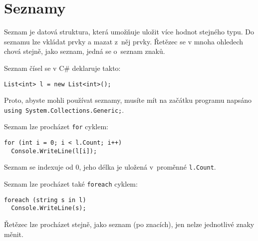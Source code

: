 \documentclass[12pt,a4paper]{article}
\begin{document}





\newpage

\section*{Seznamy}

Seznam je datová struktura, která umožňuje uložit více hodnot stejného typu.
Do seznamu lze vkládat prvky a mazat z~něj prvky. Řetězec se v mnoha ohledech
chová stejně, jako seznam, jedná se o~seznam znaků.

Seznam čísel se v C\# deklaruje takto:

\begin{verbatim}
List<int> l = new List<int>();
\end{verbatim}

Proto, abyste mohli používat seznamy, musíte mít na začátku programu napsáno\\
\texttt{using System.Collections.Generic;}.

Seznam lze procházet \texttt{for} cyklem:

\begin{verbatim}
for (int i = 0; i < l.Count; i++)
  Console.WriteLine(l[i]);
\end{verbatim}

Seznam se indexuje od 0, jeho délka je uložená v~proměnné \texttt{l.Count}.

Seznam lze procházet také \texttt{foreach} cyklem:

\begin{verbatim}
foreach (string s in l)
  Console.WriteLine(s);
\end{verbatim}

Řetězec lze procházet stejně, jako seznam (po znacích), jen nelze jednotlivé
znaky měnit.
\end{document}
